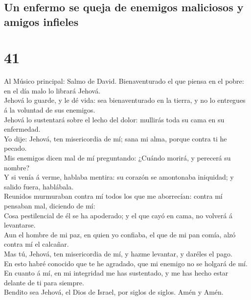 \hypertarget{un-enfermo-se-queja-de-enemigos-maliciosos-y-amigos-infieles}{%
\subsection{Un enfermo se queja de enemigos maliciosos y amigos
infieles}\label{un-enfermo-se-queja-de-enemigos-maliciosos-y-amigos-infieles}}

\hypertarget{section-19-41}{%
\section{41}\label{section-19-41}}

 Al Músico principal: Salmo de David. Bienaventurado el
que piensa en el pobre: en el día malo lo librará Jehová.\\
 Jehová lo guarde, y le dé vida: sea bienaventurado en la
tierra, y no lo entregues á la voluntad de sus enemigos.\\
 Jehová lo sustentará sobre el lecho del dolor: mullirás
toda su cama en su enfermedad.\\
 Yo dije: Jehová, ten misericordia de mí; sana mi alma,
porque contra ti he pecado.\\
 Mis enemigos dicen mal de mí preguntando: ¿Cuándo morirá,
y perecerá su nombre?\\
 Y si venía á verme, hablaba mentira: su corazón se
amontonaba iniquidad; y salido fuera, hablábala.\\
 Reunidos murmuraban contra mí todos los que me
aborrecían: contra mí pensaban mal, diciendo de mí:\\
 Cosa pestilencial de él se ha apoderado; y el que cayó en
cama, no volverá á levantarse.\\
 Aun el hombre de mi paz, en quien yo confiaba, el que de
mi pan comía, alzó contra mí el calcañar.\\
 Mas tú, Jehová, ten misericordia de mí, y hazme
levantar, y daréles el pago.\\
 En esto habré conocido que te he agradado, que mi
enemigo no se holgará de mí.\\
 En cuanto á mí, en mi integridad me has sustentado, y me
has hecho estar delante de ti para siempre.\\
 Bendito sea Jehová, el Dios de Israel, por siglos de
siglos. Amén y Amén.

